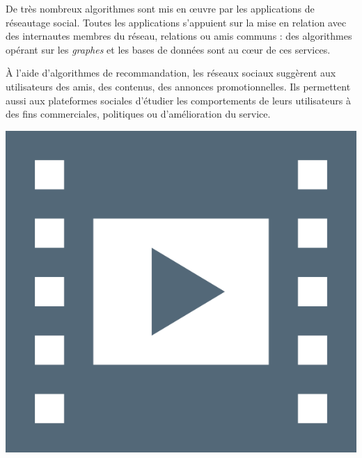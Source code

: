 \begin{tcolorbox}[title={Algorithmes et programmes}, toprule=0pt, leftrule=0pt, rightrule=0pt, arc=0pt,
                  fonttitle=\scshape\boxtitlefont,
                  colbacktitle=white, coltitle=firstcolor, colframe=firstcolor, colback=firstcolor!10,
                  breakable, enhanced jigsaw]
De très nombreux algorithmes sont mis en œuvre par les applications de réseautage social.
Toutes les applications s’appuient sur la mise en relation avec des internautes membres du réseau, relations ou amis communs : des algorithmes opérant sur les \emph{graphes} et les bases de données sont au cœur de ces services.

À l’aide d’algorithmes de recommandation, les réseaux sociaux suggèrent aux utilisateurs des amis, des contenus, des annonces promotionnelles. Ils permettent aussi aux plateformes sociales d’étudier les comportements de leurs utilisateurs à des fins commerciales, politiques ou d’amélioration du service.
\end{tcolorbox}



\begin{marginvideo}
	[\label{vid:IX.8}Réseaux sociaux.]%
	\href{https://www.youtube.com/watch?v=TaMnLOcpYEw}%
	  {\includegraphics[width=\marginparwidth]{./Images/Pictograms/film-strip-dark-electric-blue.png}}%
\end{marginvideo}

